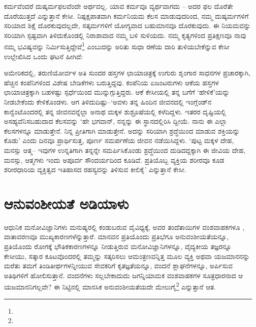 
ಕರ್ಮವೆಂದರೆ ದುಷ್ಕರ್ಮಫಲವೆಂದೇ ಅರ್ಥವಲ್ಲ. ಯಾವ ಕರ್ಮವೂ ವ್ಯರ್ಥವಾಗದು – ಅದರ ಫಲ ದೊರೆತೇ ದೊರೆಯುತ್ತದೆ ಎನ್ನುತ್ತಾನೆ ಕೇಸೀ. ನಿಷ್ಪಕ್ಷಪಾತವಾಗಿ ಕರ್ಮನಿಯಮ ಕೆಲಸ ಮಾಡುವುದರಿಂದ, ನಮ್ಮ ದುಷ್ಕರ್ಮಗಳಿಗೆ ಸರಿಯಾದ ಶಿಕ್ಷೆ ದೊರಕುವುದಲ್ಲದೇ, ಸತ್ಕರ್ಮಗಳಿಗೆ ಯೋಗ್ಯವಾದ ಬಹುಮಾನವೂ ದೊರಕುವುದು. ಈ ನಿಯಮವನ್ನು ಸರಿಯಾಗಿ ಸ್ಪಷ್ಟವಾಗಿ ತಿಳಿದುಕೊಂಡಲ್ಲಿ ನಿರಾಶಾವಾದ ನಮ್ಮ ಬಳಿ ಸುಳಿಯದು. ನಮ್ಮ ಕೃತ್ಯಗಳಿಂದ ಪ್ರತಿಕ್ಷಣವೂ ನಾವು ನಮ್ಮ ಭವಿಷ್ಯವನ್ನು ನಿರ್ಮಿಸುತ್ತಿದ್ದೇವೆ\footnote{} ಎಂಬುದನ್ನು ಅರಿತು ಸುಧಾ ರಣೆಯ ದಾರಿ ತುಳಿಯಬೇಕೆನ್ನುವ ಕೇಸೀ ಉಲ್ಲೇಖಿಸಿದ ಒಂದು ಘಟನೆ ಹೀಗಿದೆ:

ಅಮೇರಿಕದಲ್ಲಿ, ತರುಣಿಯೋರ್ವಳ ಅತಿ ಸುಂದರ ಹಸ್ತಗಳ ಛಾಯಾಚಿತ್ರಕ್ಕೆ ಉಗುರು ಶೃಂಗಾರ ಸಾಧನಗಳ ಪ್ರಚಾರಕ್ಕಾಗಿ, ಹೆಚ್ಚಿನ ಕಂಪೆನಿಗಳಿಂದ ವಿಶೇಷ ಬೇಡಿಕೆಗಳು ಬರುತ್ತಿದ್ದವು. ಕಂಪೆನಿಯ ಏಜಂಟರುಗಳು ಆಕೆಯ ಹಸ್ತಗಳ ಛಾಯಾಚಿತ್ರಕ್ಕಾಗಿ ಬಹಳಷ್ಟು ಸ್ಪರ್ಧೆಯಿಂದ ಮುನ್ನುಗ್ಗುತ್ತಿದ್ದರು. ಆಕೆ ಕೇಸೀಯಲ್ಲಿ ತನ್ನ ಬಗೆಗೆ ‘ಹೇಳಿಕೆ’ಯನ್ನು ನೀಡಬೇಕೆಂದು ಕೇಳಿಕೊಂಡಳು. ಆಗ ತಿಳಿದುದಿಷ್ಟು–‘ಅವಳು ತನ್ನ ಹಿಂದಿನ ಜೀವನದಲ್ಲಿ ಇಂಗ್ಲೆಂಡ್​ನ ಕಾನ್ವೆಂಟೊಂದ\-ರಲ್ಲಿ ತನ್ನ ಜೀವನವನ್ನೆಲ್ಲಾ ಅನಾಥ ಮಕ್ಕಳ ಶುಶ್ರೂಷೆಯಲ್ಲಿ ಕಳೆದಿದ್ದಳು. ಇತರರ ದೃಷ್ಟಿಯಲ್ಲಿ ಅಸಹ್ಯ\-ವೆನಿಸ\-ಬಹುದಾದ ಕೆಲಸವನ್ನು ‘ಹೇ ಭಗವಾನ್, ನನ್ನನ್ನು ಈ ಸ್ಥಾನದಲ್ಲಿರಿಸಿ ದ್ದೀಯೆ. ನಾನು ಈ ಎಲ್ಲಾ ಕೆಲಸಗಳನ್ನೂ ಮಾಡುತ್ತೇನೆ. ನಿನ್ನ ಪ್ರೀತಿಗಾಗಿ ಮಾಡುತ್ತೇನೆ. ಅದನ್ನು ಸರಿಯಾಗಿ ಶ್ರದ್ಧೆಯಿಂದ ಮಾಡುವ ಶಕ್ತಿಯನ್ನು ಕೊಡು’ ಎಂದು ದಿನವೂ ಪ್ರಾರ್ಥಿಸುತ್ತ, ಪೂರ್ಣ ಸಮರ್ಪಣೆಯ ಜೀವನ ನಡೆಯಿಸಿದ್ದಳು. ‘ಪುಟ್ಟ ಮಕ್ಕಳ ದೇಹ, ಮನಸ್ಸು ಆತ್ಮ– ಇವುಗಳ ಉನ್ನತಿಗಾಗಿ ತನ್ನನ್ನೇ ಸಮರ್ಪಿಸಿಕೊಂಡು ಶ್ರದ್ಧೆಯಿಂದ ದುಡಿದದ್ದಕ್ಕಾಗಿ ಈ ಜೀವಿಯ ದೇಹ, ಮನಸ್ಸು, ಆತ್ಮಗಳು ಇಂದು ಅಪೂರ್ವ ಸೌಂದರ್ಯದಿಂದ ಕೂಡಿವೆ. ಪ್ರತಿಯೊಬ್ಬ ವ್ಯಕ್ತಿಯ ಶರೀರವೂ ಕೂಡ ಶರೀರಧಾರಿಯ ವ್ಯಕ್ತಿತ್ವದ ಇತಿಹಾಸದ ರಹಸ್ಯವನ್ನು ತಿಳಿಸುವ ಕೀಲಿಕೈ’ ಎನ್ನುತ್ತಾನೆ ಕೇಸೀ.


\section*{ಆನುವಂಶೀಯತೆ ಅಡಿಯಾಳು}


ಆಧುನಿಕ ಮನೋವಿಜ್ಞಾನಿಗಳು ಮನುಷ್ಯರಲ್ಲಿ ಕಂಡುಬರುವ ವೈವಿಧ್ಯಕ್ಕೆ, ಅವರ ತಂದೆತಾಯಿಗಳ ವಂಶವಾಹಕಗಳೂ , ವಾತಾವರಣವೂ ಮುಖ್ಯಕಾರಣಗಳೆನ್ನುತ್ತಾರೆ. ಮಾನವನ ಪ್ರತಿಯೊಂದು ಪ್ರತಿಭೆಗೂ ಅನುವಂಶೀಯತೆಯನ್ನೂ, ಪ್ರತಿಯೊಂದು ರೋಗಕ್ಕೆ ಭೌತಿಕಕಾರಣಗಳನ್ನೂ ನೀಡುತ್ತಿರುವ ಮನೋವಿಜ್ಞಾನಿಗಳನ್ನೂ, ವೈದ್ಯಕೀಯ ತಜ್ಞರನ್ನೂ ಕೇಸೀಯು, ಸತ್ಕಾರ ಕೂಟವೊಂದರಲ್ಲಿ ತಮ್ಮನ್ನು ಸತ್ಕರಿಸಲು ಆಮಂತ್ರಣವನ್ನಿತ್ತ ಮೂಲ ವ್ಯಕ್ತಿ ಅಥವಾ ಯಜಮಾನನನ್ನು ಮರೆತು ತಮಗೆ ತಿಂಡಿತೀರ್ಥಗಳನ್ನೀಯುವ ಸೇವಕರಿಗೆ ಕೃತಜ್ಞತೆಯನ್ನೂ, ವಂದನೆ ಶ್ಲಾಘನೆಗಳನ್ನೂ, ಅರ್ಪಿಸುವ ಅತಿಥಿಗಳಿಗೆ ಹೋಲಿಸುತ್ತಾನೆ. ವಂದನೆಗಳು ಸಲ್ಲಬೇಕಾದುದು ಜಗನ್ನಿಯಾ\-ಮಕ ವಂಶವಾಹಕಗಳ ಸೂತ್ರಧಾರನಾದ ಆ ಯಜಮಾನನಿಗಲ್ಲವೇ? ಈ ನಿಟ್ಟಿನಲ್ಲಿ ಮಾನಸಿಕ ಅನುವಂಶೀ\-ಯತೆ\-ಯದೇ ಮೇಲುಗೈ\footnote{} ಎನ್ನುತ್ತಾನೆ ಆತ.

